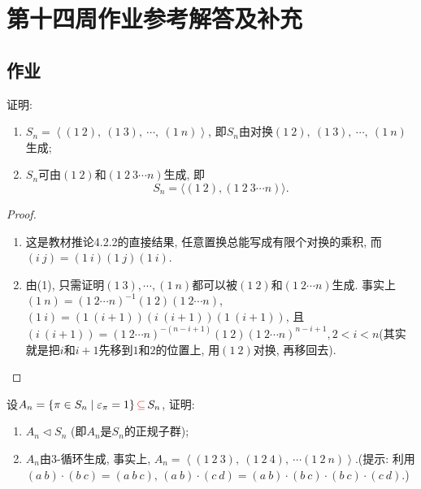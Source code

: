 \documentclass{../solutions-cn}
\begin{document}
\section*{第十四周作业参考解答及补充}

\subsection*{作业}

\begin{exercise}[习题4.2.2]
    证明: 
    \begin{enumerate}[(1)]
        \item $S_{n} = \left\langle (1\:2),\: (1\:3),\: \cdots,\: (1\:n) \right\rangle$, 即$S_n$由对换$(1\:2),\: (1\:3),\: \cdots,\: (1\:n)$生成;
        \item $S_{n}$可由$(1\:2)$和$(1\:2\:3 \cdots n)$生成, 即
        \[
            S_n = \big\langle (1\:2),(1\:2\:3 \cdots n) \big\rangle.
        \]
    \end{enumerate}
\end{exercise}

\begin{proof}
    \begin{enumerate}[(1)]
        \item 这是教材推论4.2.2的直接结果, 任意置换总能写成有限个对换的乘积, 而$(i\:j) = (1\:i)(1\:j)(1\:i)$.
        \item 由(1), 只需证明$(1\:3), \cdots, (1\:n)$都可以被$(1\:2)$和$(1\:2 \cdots n)$生成. 事实上$(1\:n) = (1\:2 \cdots n)^{-1}(1\:2)(1\:2 \cdots n)$, $(1\:i) = (1\:(i+1))(i\:(i + 1))(1\:(i + 1))$, 且$(i\:(i + 1)) = (1\:2 \cdots n)^{-(n - i + 1)}(1\:2)(1\:2 \cdots n)^{n - i + 1}, 2 < i < n$(其实就是把$i$和$i + 1$先移到$1$和$2$的位置上, 用$(1\:2)$对换, 再移回去).
    \end{enumerate}
\end{proof}

\begin{exercise}[习题4.2.4]
    设$A_n= \{\pi \in S_n \mid \varepsilon_\pi = 1\} \,\textcolor{red}{\subseteq}\, S_n$, 证明: 
    \begin{enumerate}[(1)]
        \item $A_n \lhd S_n$ (即$A_n$是$S_n$的正规子群);
        \item $A_n$由$3$-循环生成, 事实上, $A_n = \left\langle (1\:2\:3),\: (1\:2\:4),\: \cdots (1\:2\:n) \right\rangle$.(提示: 利用$(a\:b) \cdot (b\:c) = (a\:b\:c),\, (a\:b) \cdot (c\:d) = (a\:b) \cdot (b\:c) \cdot (b\:c) \cdot (c\:d)$.)
    \end{enumerate}
\end{exercise}
\end{document}
